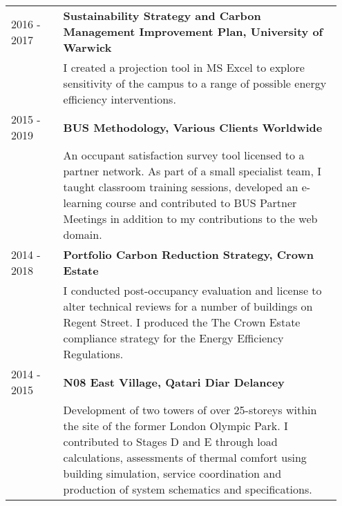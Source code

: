 \documentclass[11pt, oneside]{article}   	%
\begin{document}
\begin{table}[h]
\begin{center}
\begin{tabular}{p{0.15\linewidth} p{0.8\linewidth}}
2016 - 2017&\textbf{Sustainability Strategy and Carbon Management Improvement Plan, University of Warwick} \\
&I created a projection tool in MS Excel to explore sensitivity of the campus to a range of possible energy efficiency interventions. \\
2015 - 2019&\textbf{BUS Methodology, Various Clients Worldwide} \\
&An occupant satisfaction survey tool licensed to a partner network. As part of a small specialist team, I taught classroom training sessions, developed an e-learning course and contributed to BUS Partner Meetings in addition to my contributions to the web domain. \\
2014 - 2018&\textbf{Portfolio Carbon Reduction Strategy, Crown Estate} \\
&I conducted post-occupancy evaluation and license to alter technical reviews for a number of buildings on Regent Street. I produced the The Crown Estate compliance strategy for the Energy Efficiency Regulations. \\
2014 - 2015&\textbf{N08 East Village, Qatari Diar Delancey} \\
&Development of two towers of over 25-storeys within the site of the former London Olympic Park. I contributed to Stages D and E through load calculations, assessments of thermal comfort using building simulation, service coordination and production of system schematics and specifications. \\
\hline
\end{tabular}
\end{center}
\vspace{-10mm}
\end{table}
\end{document}
